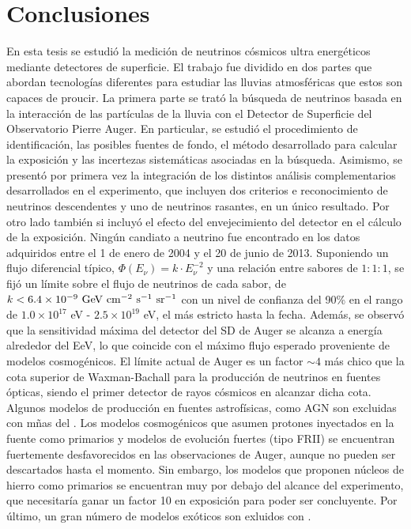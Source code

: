 \chapter{Conclusiones}
\label{ch:concl}

En esta tesis se estudi\'o la medici\'on de neutrinos c\'osmicos ultra energ\'eticos mediante detectores de superficie. 
El trabajo fue dividido en dos partes que abordan tecnolog\'ias diferentes para estudiar las lluvias atmosf\'ericas que estos son capaces de proucir.
La primera parte se trat\'o la b\'usqueda de neutrinos basada en la interacci\'on de las part\'iculas de la lluvia con el Detector de Superficie del Observatorio Pierre Auger.
En particular, se estudi\'o el procedimiento de identificaci\'on, las posibles fuentes de fondo, el m\'etodo desarrollado para calcular la exposici\'on y las incertezas sistem\'aticas asociadas en la b\'usqueda.
Asimismo, se present\'o por primera vez la integraci\'on de los distintos an\'alisis complementarios desarrollados en el experimento, que incluyen dos criterios e reconocimiento de neutrinos descendentes y uno de neutrinos rasantes, en un \'unico resultado.
Por otro lado tambi\'en si incluy\'o el efecto del envejecimiento del detector en el c\'alculo de la exposici\'on.
Ning\'un candiato a neutrino fue encontrado en los datos adquiridos entre el 1 de enero de 2004 y el 20 de junio de 2013. 
Suponiendo un flujo diferencial t\'ipico, $\Phi(E_\nu)= k\cdot E^{-2}_\nu$ y una relaci\'on entre sabores de $1 : 1 : 1$, se fij\'o un l\'imite sobre el flujo de neutrinos de cada sabor, de $k < 6.4 \times 10^{-9}~{\rm GeV~cm^{-2}~s^{-1}~sr^{-1}}$ con un nivel de confianza del 90\% en el rango de ${1.0 \times 10^{17}}$ {eV} - ${2.5 \times 10^{19}}$ {eV}, el m\'as estricto hasta la fecha.
Adem\'as, se observ\'o que la sensitividad m\'axima del detector del SD de Auger se alcanza a energ\'ia alrededor del EeV, lo que coincide con el m\'aximo flujo esperado proveniente de modelos cosmog\'enicos.
El l\'imite actual de Auger es un factor $\sim4$ m\'as chico que la cota superior de Waxman-Bachall para la producci\'on de neutrinos en fuentes \'opticas, siendo el primer detector de rayos c\'osmicos en alcanzar dicha cota.
Algunos modelos de producci\'on en fuentes astrof\'isicas, como AGN son excluidas con m\~nas del .
Los modelos cosmog\'enicos que asumen protones inyectados en la fuente como primarios y modelos de evoluci\'on fuertes (tipo FRII) se encuentran fuertemente desfavorecidos en las observaciones de Auger, aunque no pueden ser descartados hasta el momento.
Sin embargo, los modelos que proponen n\'ucleos de hierro como primarios se encuentran muy por debajo del alcance del experimento, que necesitar\'ia ganar un factor 10 en exposici\'on para poder ser concluyente.
Por \'ultimo, un gran n\'umero de modelos ex\'oticos son exluidos con .

